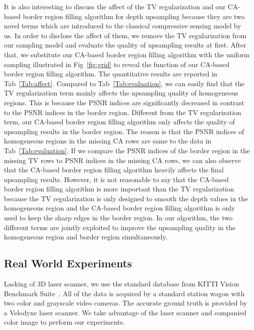 \documentclass[preprint,10pt,5p,times,twocolumn]{elsarticle}
\begin{document}
It is also interesting to discuss the affect of the TV regularization and our CA-based border region filling algorithm for depth upsampling because they are two novel terms which are introduced to the classical compressive sensing model by us. In order to disclose the affect of them, we remove the TV regularization from our sampling model and evaluate the quality of upsampling results at first. After that, we substitute our CA-based border region filling algorithm with the uniform sampling illustrated in Fig~\ref{fig:grid} to reveal the function of our CA-based border region filling algorithm. The quantitative results are reported in Tab~\ref{Tab:affect}. Compared to Tab~\ref{Tab:evaluation}, we can easily find that the TV regularization term mainly affects the upsampling quality of homogeneous regions. This is because the PSNR indices are significantly decreased in contrast to the PSNR indices in the border region.  Different from the TV regularization term, our CA-based border region filling algorithm only affects the quality of upsampling results in the border region. The reason is that the PSNR indices of homogeneous regions in the missing CA rows are same to the data in Tab~\ref{Tab:evaluation}. If we compare the PSNR indices of the border region in the missing TV rows to PSNR indices in the missing CA rows, we can also observe that the CA-based border region filling algorithm heavily affects the final upsampling results. However, it is not reasonable to say that the CA-based border region filling algorithm is more important than the TV regularization because the TV regularization is only designed to smooth the depth values in the homogeneous region and the CA-based border region filling algorithm is only used to keep the sharp edges in the border region. In our algorithm, the two different terms are jointly exploited to improve the upsampling quality in the homogeneous region and border region simultaneously.


\subsection{Real World Experiments}

Lacking of 3D laser scanner, we use the standard database from KITTI Vision Benchmark Suite~\cite{Geiger12}. All of the data is acquired by a standard station wagon with two color and grayscale video cameras. The accurate ground truth is provided by a Velodyne laser scanner. We take advantage of the laser scanner and companied color image to perform our experiments.
\end{document}
